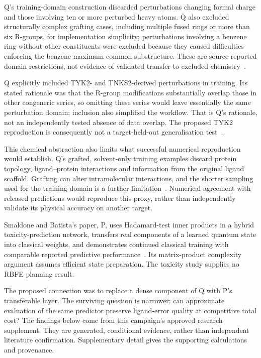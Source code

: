 \documentclass{article}
\begin{document}
Q's training-domain construction discarded perturbations changing formal charge and those involving ten or more perturbed heavy atoms. Q also excluded structurally complex grafting cases, including multiple fused rings or more than six R-groups, for implementation simplicity; perturbations involving a benzene ring without other constituents were excluded because they caused difficulties enforcing the benzene maximum common substructure. These are source-reported domain restrictions, not evidence of validated transfer to excluded chemistry~\cite{Q}.

Q explicitly included TYK2- and TNKS2-derived perturbations in training. Its stated rationale was that the R-group modifications substantially overlap those in other congeneric series, so omitting these series would leave essentially the same perturbation domain; inclusion also simplified the workflow. That is Q's rationale, not an independently tested absence of data overlap. The proposed TYK2 reproduction is consequently not a target-held-out generalisation test~\cite{Q}.

This chemical abstraction also limits what successful numerical reproduction would establish. Q's grafted, solvent-only training examples discard protein topology, ligand--protein interactions and information from the original ligand scaffold. Grafting can alter intramolecular interactions, and the shorter sampling used for the training domain is a further limitation~\cite{Q}. Numerical agreement with released predictions would reproduce this proxy, rather than independently validate its physical accuracy on another target.

Smaldone and Batista's paper, P, uses Hadamard-test inner products in a hybrid toxicity-prediction network, transfers real components of a learned quantum state into classical weights, and demonstrates continued classical training with comparable reported predictive performance~\cite{P}. Its matrix-product complexity argument assumes efficient state preparation. The toxicity study supplies no RBFE planning result.

The proposed connection was to replace a dense component of Q with P's transferable layer. The surviving question is narrower: can approximate evaluation of the same predictor preserve ligand-error quality at competitive total cost? The findings below come from this campaign's approved research supplement. They are generated, conditional evidence, rather than independent literature confirmation. Supplementary detail gives the supporting calculations and provenance.
\end{document}
